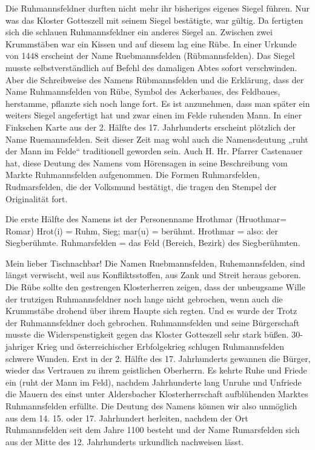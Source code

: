 \documentclass[12pt,a4paper]{book}
\begin{document}
Die Ruhmannsfeldner durften nicht mehr ihr bisheriges eigenes Siegel führen. Nur
was das Kloster Gotteszell mit seinem Siegel bestätigte, war gültig. Da
fertigten sich die schlauen Ruhmannsfeldner ein anderes Siegel an. Zwischen zwei
Krummstäben war ein Kissen und auf diesem lag eine Rübe. In einer Urkunde von
1448 erscheint der Name Ruebmannsfelden (Rübmannsfelden). Das Siegel musste
selbstverständlich auf Befehl des damaligen Abtes sofort verschwinden. Aber die
Schreibweise des Namens Rübmannsfelden und die Erklärung, dass der Name
Ruhmannsfelden von Rübe, Symbol des Ackerbaues, des Feldbaues, herstamme,
pflanzte sich noch lange fort. Es ist anzunehmen, dass man später ein weiters
Siegel angefertigt hat und zwar einen im Felde ruhenden Mann. In einer Finkschen
Karte aus der 2. Hälfte des 17. Jahrhunderts erscheint plötzlich der Name
Ruemannsfelden. Seit dieser Zeit mag wohl auch die Namensdeutung „ruht der Mann
im Felde“ traditionell geworden sein. Auch H. Hr. Pfarrer Castenauer hat, diese
Deutung des Namens vom Hörensagen in seine Beschreibung vom Markte
Ruhmannsfelden aufgenommen. Die Formen Ruhmarsfelden, Rudmarsfelden, die der
Volksmund bestätigt, die tragen den Stempel der Originalität fort.

Die erste Hälfte des Namens ist der Personenname Hrothmar (Hruothmar= Romar)
Hrot(i) = Ruhm, Sieg; mar(u) = berühmt. Hrothmar = also: der Siegberühmte.
Ruhmarsfelden = das Feld (Bereich, Bezirk) des Siegberühmten.

Mein lieber Tischnachbar! Die Namen Ruebmannsfelden, Ruhemannsfelden, sind
längst verwischt, weil aus Konfliktsstoffen, aus Zank und Streit heraus geboren.
Die Rübe sollte den gestrengen Klosterherren zeigen, dass der unbeugsame Wille
der trutzigen Ruhmannsfeldner noch lange nicht gebrochen, wenn auch die
Krummstäbe drohend über ihrem Haupte sich regten. Und es wurde der Trotz der
Ruhmannsfeldner doch gebrochen. Ruhmannsfelden und seine Bürgerschaft musste die
Widerspenstigkeit gegen das Kloster Gotteszell sehr stark büßen. 30-jahriger
Krieg und österreichischer Erbfolgekrieg schlugen Ruhmannsfelden schwere Wunden.
Erst in der 2. Hälfte des 17. Jahrhunderts gewannen die Bürger, wieder das
Vertrauen zu ihrem geistlichen Oberherrn. Es kehrte Ruhe und Friede ein (ruht
der Mann im Feld), nachdem Jahrhunderte lang Unruhe und Unfriede die Mauern des
einst unter Aldersbacher Klosterherrschaft aufblühenden Marktes Ruhmannsfelden
erfüllte. Die Deutung des Namens können wir also unmöglich aus dem 14. 15. oder
17. Jahrhundert herleiten, nachdem der Ort Ruhmannsfelden seit dem Jahre 1100
besteht und der Name Rumarsfelden sich aus der Mitte des 12. Jahrhunderts
urkundlich nachweisen lässt.
\end{document}
